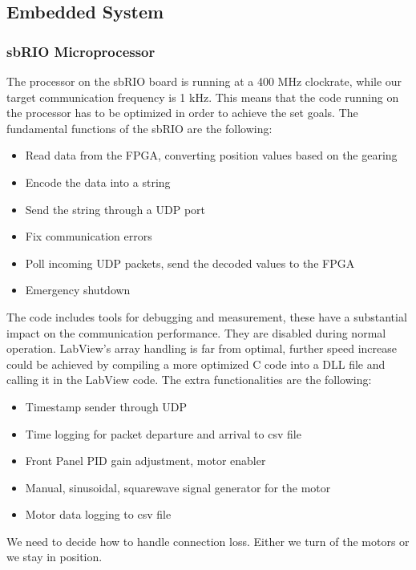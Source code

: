 \subsection{Embedded System}
\label{Embedded}
\subsubsection{sbRIO Microprocessor}

The processor on the sbRIO board is running at a 400 MHz clockrate, while our target communication frequency is 1 kHz. This means that the code running on the processor has to be optimized in order to achieve the set goals. The fundamental functions of the sbRIO are the following:

\begin{itemize}
	\setlength\itemsep{0em}
	\item Read data from the FPGA, converting position values based on the gearing
	\item Encode the data into a string
	\item Send the string through a UDP port
	\item Fix communication errors
	\item Poll incoming UDP packets, send the decoded values to the FPGA
	\item Emergency shutdown	
\end{itemize}


The code includes tools for debugging and measurement, these have a substantial impact on the communication performance. They are disabled during normal operation. LabView's array handling is far from optimal, further speed increase could be achieved by compiling a more optimized C code into a DLL file and calling it in the LabView code. The extra functionalities are the following:

\begin{itemize}	
	\setlength\itemsep{0em}
	\item Timestamp sender through UDP
	\item Time logging for packet departure and arrival to csv file
	\item Front Panel PID gain adjustment, motor enabler
	\item Manual, sinusoidal, squarewave signal generator for the motor
	\item Motor data logging to csv file
	
\end{itemize}

We need to decide how to handle connection loss. Either we turn of the motors or we stay in position.

